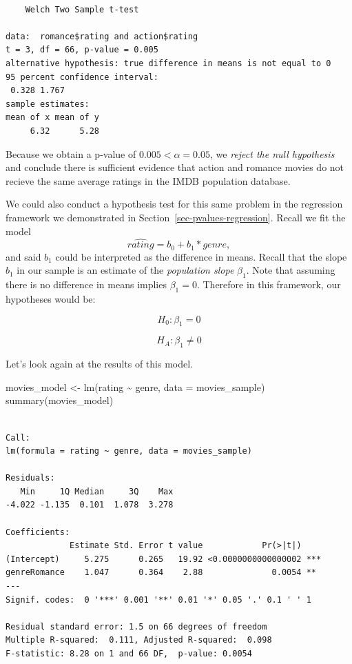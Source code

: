 \documentclass[
  letterpaper,
  DIV=11,
  numbers=noendperiod]{scrreprt}
\newenvironment{Shaded}{\begin{snugshade}}{\end{snugshade}}
\newcommand{\AttributeTok}[1]{\textcolor[rgb]{0.40,0.45,0.13}{#1}}
\newcommand{\FunctionTok}[1]{\textcolor[rgb]{0.28,0.35,0.67}{#1}}
\newcommand{\NormalTok}[1]{\textcolor[rgb]{0.00,0.23,0.31}{#1}}
\newcommand{\OtherTok}[1]{\textcolor[rgb]{0.00,0.23,0.31}{#1}}
\newcommand{\SpecialCharTok}[1]{\textcolor[rgb]{0.37,0.37,0.37}{#1}}
\theoremstyle{definition}
\theoremstyle{remark}
\begin{document}
\begin{verbatim}

    Welch Two Sample t-test

data:  romance$rating and action$rating
t = 3, df = 66, p-value = 0.005
alternative hypothesis: true difference in means is not equal to 0
95 percent confidence interval:
 0.328 1.767
sample estimates:
mean of x mean of y 
     6.32      5.28 
\end{verbatim}

Because we obtain a p-value of \(0.005 < \alpha = 0.05\), we
\emph{reject the null hypothesis} and conclude there is sufficient
evidence that action and romance movies do not recieve the same average
ratings in the IMDB population database.

We could also conduct a hypothesis test for this same problem in the
regression framework we demonstrated in
Section~\ref{sec-pvalues-regression}. Recall we fit the model
\[\widehat{rating} = b_0 + b_1*genre,\] and said \(b_1\) could be
interpreted as the difference in means. Recall that the slope \(b_1\) in
our sample is an estimate of the \emph{population slope} \(\beta_1\).
Note that assuming there is no difference in means implies
\(\beta_1 = 0\). Therefore in this framework, our hypotheses would be:

\[H_0: \beta_1 = 0\]

\[H_A: \beta_1 \neq 0\]

Let's look again at the results of this model.

\begin{Shaded}
\begin{Highlighting}[]
\NormalTok{movies\_model }\OtherTok{\textless{}{-}} \FunctionTok{lm}\NormalTok{(rating }\SpecialCharTok{\textasciitilde{}}\NormalTok{ genre, }\AttributeTok{data =}\NormalTok{ movies\_sample)}
\FunctionTok{summary}\NormalTok{(movies\_model)}
\end{Highlighting}
\end{Shaded}

\begin{verbatim}

Call:
lm(formula = rating ~ genre, data = movies_sample)

Residuals:
   Min     1Q Median     3Q    Max 
-4.022 -1.135  0.101  1.078  3.278 

Coefficients:
             Estimate Std. Error t value            Pr(>|t|)    
(Intercept)     5.275      0.265   19.92 <0.0000000000000002 ***
genreRomance    1.047      0.364    2.88              0.0054 ** 
---
Signif. codes:  0 '***' 0.001 '**' 0.01 '*' 0.05 '.' 0.1 ' ' 1

Residual standard error: 1.5 on 66 degrees of freedom
Multiple R-squared:  0.111, Adjusted R-squared:  0.098 
F-statistic: 8.28 on 1 and 66 DF,  p-value: 0.0054
\end{verbatim}
\end{document}
